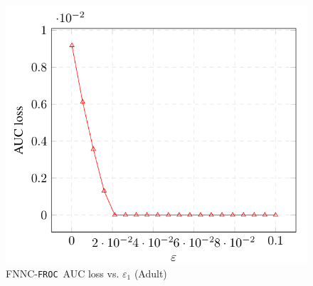 \documentclass{article}
\newcommand{\ouralgo}{\texttt{FROC}}
\begin{document}
\begin{figure}[!h]
    \centering
    \includegraphics[width=1\linewidth]{Images/FNNC_Adult_AUC.png}
    \caption{FNNC-\ouralgo\ AUC loss vs. $\varepsilon_1$ (Adult)}
    \label{fig:FNNC_Adult_AUC}
\end{figure}





        
        
\end{document}

